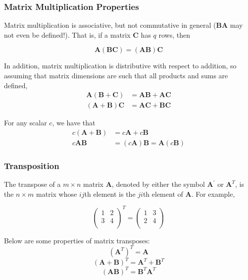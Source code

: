 \documentclass{beamer}
\begin{document}
\begin{frame}
\frametitle{Matrix Multiplication Properties}
Matrix multiplication is associative, but not commutative in general ($\mathbf{BA}$ may not even be defined!).  That is, if a matrix $\mathbf{C}$ has $q$ rows, then

\[\mathbf{A}(\mathbf{BC}) = (\mathbf{AB})\mathbf{C}\]

In addition, matrix multiplication is distributive with respect to addition, so assuming that matrix dimensions are such that all products and sums are defined,
\begin{align*}
\mathbf{A} (\mathbf{B} + \mathbf{C}) &= \mathbf{AB} + \mathbf{AC}\\
(\mathbf{A} + \mathbf{B}) \mathbf{C}  &= \mathbf{AC} + \mathbf{BC}
\end{align*}

For any scalar $c$, we have that
\begin{align*}
c(\mathbf{A} + \mathbf{B}) &= c\mathbf{A} + c\mathbf{B}\\
c\mathbf{AB} &= (c\mathbf{A})\mathbf{B} = \mathbf{A}(c\mathbf{B})
\end{align*}
\end{frame}

\begin{frame}
\frametitle{Transposition}
The transpose of a $m \times n$ matrix $\mathbf{A}$, denoted by either the symbol $\mathbf{A}^{'}$ or $\mathbf{A}^T$, is the $n \times m$ matrix whose $ij$th element is the $ji$th element of $\mathbf{A}$.  For example,

\[
\begin{pmatrix}
    1 & 2\\
    3 & 4 \\
\end{pmatrix}^T
= 
\begin{pmatrix}
    1 & 3\\
    2 & 4 \\
\end{pmatrix}
\]

Below are some properties of matrix transposes:
\[
(\mathbf{A}^T)^T = \mathbf{A}
\]
\[
(\mathbf{A} + \mathbf{B})^{T} = \mathbf{A}^T + \mathbf{B}^T
\]
\[
(\mathbf{A}\mathbf{B})^{T} = \mathbf{B}^T\mathbf{A}^T
\]

\end{frame}
\end{document}

